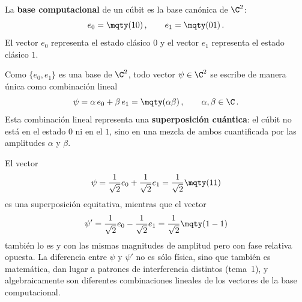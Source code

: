 \begin{defi}
  \label{def:base-computacional}
  La \textbf{base computacional} de un cúbit es la base canónica de $\C^2$:
  \[
    e_0 = \mqty(1\\0)\,,\qquad e_1 = \mqty(0\\1)\,.
  \]
  El vector $e_0$ representa el estado clásico $0$ y el vector $e_1$ representa el estado clásico $1$.
\end{defi}

Como $\{e_0,e_1\}$ es una base de $\C^2$, todo vector $\psi\in\C^2$ se escribe de manera única como combinación lineal
\[
  \psi = \alpha\,e_0 + \beta\,e_1 = \mqty(\alpha\\\beta)\,,\qquad \alpha,\beta\in\C\,.
\]
Esta combinación lineal representa una \textbf{superposición cuántica}: el cúbit no está en el estado $0$ ni en el $1$, sino en una mezcla de ambos cuantificada por las amplitudes $\alpha$ y $\beta$.

\begin{eje}
  El vector
  \[
    \psi = \dfrac{1}{\sqrt{2}}e_0 + \dfrac{1}{\sqrt{2}}e_1 = \dfrac{1}{\sqrt{2}}\mqty(1\\1)
  \]
  es una superposición equitativa, mientras que el vector
  \[
    \psi' = \dfrac{1}{\sqrt{2}}e_0 - \dfrac{1}{\sqrt{2}}e_1 = \dfrac{1}{\sqrt{2}}\mqty(1\\-1)
  \]
  también lo es y con las mismas magnitudes de amplitud pero con fase relativa opuesta. La diferencia entre $\psi$ y $\psi'$ no es sólo física, sino que también es matemática, dan lugar a patrones de interferencia distintos (tema~1), y algebraicamente son diferentes combinaciones lineales de los vectores de la base computacional.
\end{eje}
